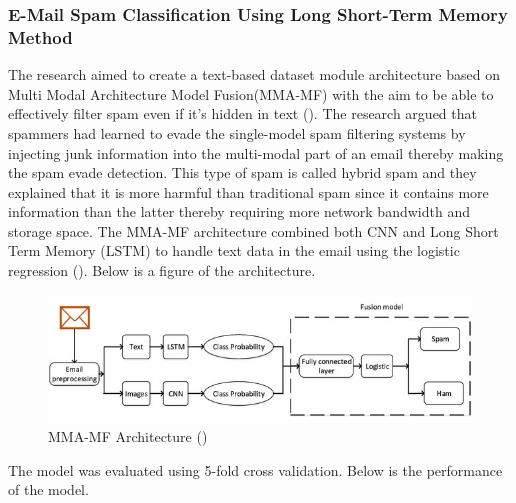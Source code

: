 \subsubsection{E-Mail Spam Classification Using Long Short-Term Memory Method}
The research aimed to create a text-based dataset module architecture based on Multi Modal Architecture Model Fusion(MMA-MF) with the aim to be able to effectively filter spam even if it's hidden in text (\cite{dongre_patidar_2019}). The research argued that spammers had learned to evade the single-model spam filtering systems by injecting junk information into the multi-modal part of an email thereby making the spam evade detection. This type of spam is called hybrid spam and they explained that it is more harmful than traditional spam since it contains more information than the latter thereby requiring more network bandwidth and storage space. The MMA-MF architecture combined both CNN and Long Short Term Memory (LSTM) to handle text data in the email using the logistic regression (\cite{dongre_patidar_2019}).
Below is a figure of the architecture.
\begin{figure}[H]
    \centering
    \includegraphics[width=13cm]{img/mma-mf.jpg}
    \caption{MMA-MF Architecture (\cite{dongre_patidar_2019})}
    \label{fig:hybrid}
\end{figure}

The model was evaluated using 5-fold cross validation. Below is the performance of the model.

